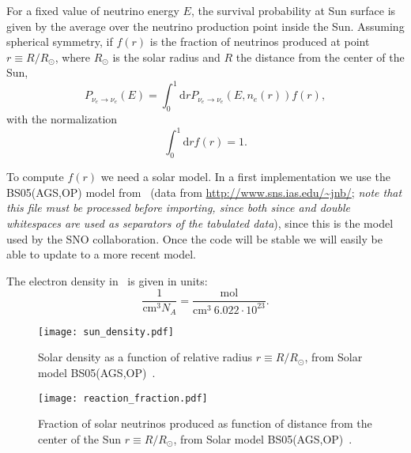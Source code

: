 \documentclass{article}
\newcommand{\cm}[0]{\text{cm}}
\newcommand{\de}[0]{\text{d}}
\begin{document}
For a fixed value of neutrino energy $E$, the survival probability at Sun surface is given by the average over the neutrino production point inside the Sun. Assuming spherical symmetry, if $f(r)$ is the fraction of neutrinos produced at point $r \equiv R/R_\odot$, where $R_\odot$ is the solar radius and $R$ the distance from the center of the Sun, 
\begin{equation}
	P_{\nu_e \rightarrow \nu_e}(E) = \int_0^1 \de r P_{\nu_e \rightarrow \nu_e}(E, n_e(r)) f(r),
\end{equation}
with the normalization
\begin{equation}
	\int_0^1 \de r f(r) = 1.
\end{equation}

To compute $f(r)$ we need a solar model. In a first implementation we use the BS05(AGS,OP) model from~\cite{Bahcall:2004pz} (data from \url{http://www.sns.ias.edu/~jnb/}; \emph{note that this file must be processed before importing, since both since and double whitespaces are used as separators of the tabulated data}), since this is the model used by the SNO collaboration. Once the code will be stable we will easily be able to update to a more recent model.

The electron density in~\cite{Bahcall:2004pz} is given in units:
\begin{equation}
	\frac{1}{\cm^3 N_A} = \frac{\text{mol}}{\cm^3\ 6.022 \cdot 10^{23} }.
\end{equation}
	
\begin{figure}[htb]
\centering
\texttt{[image: sun\_density.pdf]}
\caption{Solar density as a function of relative radius $r \equiv R/R_\odot$, from Solar model BS05(AGS,OP)~\cite{Bahcall:2004pz}.}
\end{figure}

\begin{figure}
	\texttt{[image: reaction\_fraction.pdf]}
	\centering
	\caption{Fraction of solar neutrinos produced as function of distance from the center of the Sun $r\equiv R/R_\odot$, from Solar model BS05(AGS,OP)~\cite{Bahcall:2004pz}.}
\end{figure}



\end{document}

